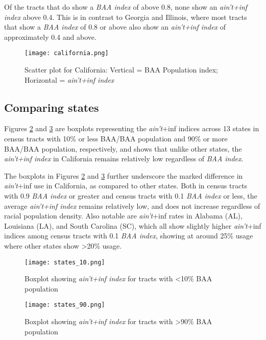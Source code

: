\documentclass[output=paper,colorlinks,citecolor=brown,draftmode]{langscibook}
\begin{document}
Of the tracts that do show a \textit{BAA index} of above 0.8, none show an \textit{ain't+inf index} above 0.4.  This is in contrast to Georgia and Illinois, where most tracts that show a \textit{BAA index} of 0.8 or above also show an \textit{ain't+inf index} of approximately 0.4 and above.


\begin{figure}
    \texttt{[image: california.png]}
    \caption{Scatter plot for California: Vertical = BAA Population index; Horizontal = \textit{ain't+inf index}}
    \label{fig:california}
\end{figure}

\subsection{Comparing states}
Figures \ref{fig:states_10} and \ref{fig:states_90} are boxplots representing the \textit{ain't}+inf indices across 13 states in census tracts with 10\% or less BAA/BAA population and 90\% or more BAA/BAA population, respectively, and shows that unlike other states, the \textit{ain't+inf index} in California remains relatively low regardless of \textit{BAA index}.

The boxplots in Figures \ref{fig:states_10} and \ref{fig:states_90} further underscore the marked difference in \textit{ain't}+inf use in California, as compared to other states.  Both in census tracts with 0.9 \textit{BAA index} or greater and census tracts with 0.1 \textit{BAA index} or less, the average \textit{ain't+inf index} remains relatively low, and does not increase regardless of racial population density.  Also notable are \textit{ain't}+inf rates in Alabama (AL), Louisiana (LA), and South Carolina (SC), which all show slightly higher \textit{ain't}+inf indices among census tracts with 0.1 \textit{BAA index}, showing at around 25\% usage where other states show >20\% usage.

\vfill
\begin{figure}[H]
    \texttt{[image: states\_10.png]}
    \caption{Boxplot showing \textit{ain't+inf index} for tracts with <10\% BAA population}
    \label{fig:states_10}
\end{figure}
\vfill
\pagebreak

\begin{figure}[t]
    \texttt{[image: states\_90.png]}
    \caption{Boxplot showing \textit{ain't+inf index} for tracts with >90\% BAA population}
    \label{fig:states_90}
\end{figure}
\end{document}
